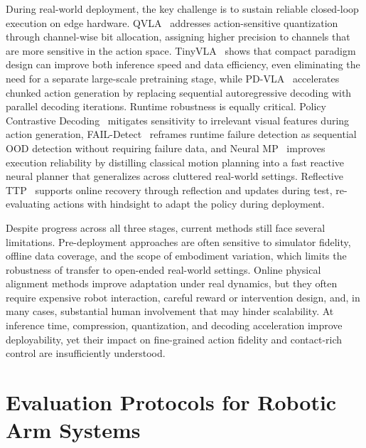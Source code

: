 \documentclass[acmsmall,screen,review]{acmart}
\begin{document}
During real-world deployment, the key challenge is to sustain reliable closed-loop execution on edge hardware.
QVLA~\cite{xu2026qvla} addresses action-sensitive quantization through channel-wise bit allocation, assigning higher precision to channels that are more sensitive in the action space. 
TinyVLA~\cite{wen2025tinyvla} shows that compact paradigm design can improve both inference speed and data efficiency, even eliminating the need for a separate large-scale pretraining stage, while PD-VLA~\cite{pdvla2025} accelerates chunked action generation by replacing sequential autoregressive decoding with parallel decoding iterations.
Runtime robustness is equally critical. 
Policy Contrastive Decoding~\cite{wu2026policycontrastive} mitigates sensitivity to irrelevant visual features during action generation, 
FAIL-Detect~\cite{xu2025detectfailures} reframes runtime failure detection as sequential OOD detection without requiring failure data, and Neural MP~\cite{dalal2024neuralmp} improves execution reliability by distilling classical motion planning into a fast reactive neural planner that generalizes across cluttered real-world settings. Reflective TTP~\cite{hong2026rttp} supports online recovery through reflection and updates during test, re-evaluating actions with hindsight to adapt the policy during deployment.

Despite progress across all three stages, current methods still face several limitations. 
Pre-deployment approaches are often sensitive to simulator fidelity, offline data coverage, and the scope of embodiment variation, which limits the robustness of transfer to open-ended real-world settings. 
Online physical alignment methods improve adaptation under real dynamics, but they often require expensive robot interaction, careful reward or intervention design, and, in many cases, substantial human involvement that may hinder scalability. 
At inference time, compression, quantization, and decoding acceleration improve deployability, yet their impact on fine-grained action fidelity and contact-rich control are insufficiently understood.

\section{Evaluation Protocols for Robotic Arm Systems}\label{sec:evaluation}
\end{document}
